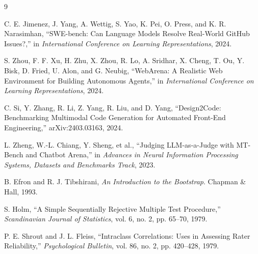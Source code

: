 \documentclass[9pt,twocolumn]{extarticle}
\begin{document}
\begin{thebibliography}{9}
\small

C. E. Jimenez, J. Yang, A. Wettig, S. Yao, K. Pei, O. Press, and K. R.
Narasimhan, ``SWE-bench: Can Language Models Resolve Real-World GitHub
Issues?,'' in \emph{International Conference on Learning Representations},
2024.

S. Zhou, F. F. Xu, H. Zhu, X. Zhou, R. Lo, A. Sridhar, X. Cheng, T. Ou,
Y. Bisk, D. Fried, U. Alon, and G. Neubig, ``WebArena: A Realistic Web
Environment for Building Autonomous Agents,'' in \emph{International
Conference on Learning Representations}, 2024.

C. Si, Y. Zhang, R. Li, Z. Yang, R. Liu, and D. Yang, ``Design2Code:
Benchmarking Multimodal Code Generation for Automated Front-End Engineering,''
arXiv:2403.03163, 2024.

L. Zheng, W.-L. Chiang, Y. Sheng, et al., ``Judging LLM-as-a-Judge with
MT-Bench and Chatbot Arena,'' in \emph{Advances in Neural Information
Processing Systems, Datasets and Benchmarks Track}, 2023.

B. Efron and R. J. Tibshirani, \emph{An Introduction to the Bootstrap}.
Chapman \& Hall, 1993.

S. Holm, ``A Simple Sequentially Rejective Multiple Test Procedure,''
\emph{Scandinavian Journal of Statistics}, vol. 6, no. 2, pp. 65--70, 1979.

P. E. Shrout and J. L. Fleiss, ``Intraclass Correlations: Uses in Assessing
Rater Reliability,'' \emph{Psychological Bulletin}, vol. 86, no. 2,
pp. 420--428, 1979.

\end{thebibliography}
\end{document}
